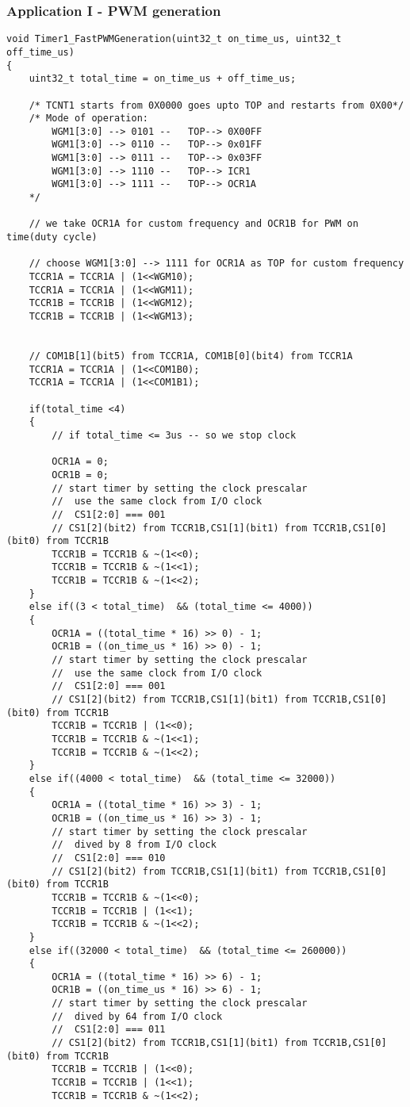 \documentclass{article}
\begin{document}
\subsubsection{Application I - PWM generation}
\begin{verbatim}
void Timer1_FastPWMGeneration(uint32_t on_time_us, uint32_t off_time_us)
{
	uint32_t total_time = on_time_us + off_time_us;
	
	/* TCNT1 starts from 0X0000 goes upto TOP and restarts from 0X00*/
	/* Mode of operation:
		WGM1[3:0] --> 0101 --	TOP--> 0X00FF
		WGM1[3:0] --> 0110 --	TOP--> 0x01FF
		WGM1[3:0] --> 0111 --	TOP--> 0x03FF
		WGM1[3:0] --> 1110 --	TOP--> ICR1
		WGM1[3:0] --> 1111 --	TOP--> OCR1A
	*/
	
	// we take OCR1A for custom frequency and OCR1B for PWM on time(duty cycle)
	
	// choose WGM1[3:0] --> 1111 for OCR1A as TOP for custom frequency
	TCCR1A = TCCR1A | (1<<WGM10);
	TCCR1A = TCCR1A | (1<<WGM11);
	TCCR1B = TCCR1B | (1<<WGM12);
	TCCR1B = TCCR1B | (1<<WGM13);
	

	// COM1B[1](bit5) from TCCR1A, COM1B[0](bit4) from TCCR1A
	TCCR1A = TCCR1A | (1<<COM1B0);
	TCCR1A = TCCR1A | (1<<COM1B1);
	
	if(total_time <4)
	{
		// if total_time <= 3us -- so we stop clock
		
		OCR1A = 0;
		OCR1B = 0;
		// start timer by setting the clock prescalar
		//  use the same clock from I/O clock
		//  CS1[2:0] === 001
		// CS1[2](bit2) from TCCR1B,CS1[1](bit1) from TCCR1B,CS1[0](bit0) from TCCR1B
		TCCR1B = TCCR1B & ~(1<<0);
		TCCR1B = TCCR1B & ~(1<<1);
		TCCR1B = TCCR1B & ~(1<<2);
	}
	else if((3 < total_time)  && (total_time <= 4000))
	{
		OCR1A = ((total_time * 16) >> 0) - 1;
		OCR1B = ((on_time_us * 16) >> 0) - 1;
		// start timer by setting the clock prescalar
		//  use the same clock from I/O clock
		//  CS1[2:0] === 001
		// CS1[2](bit2) from TCCR1B,CS1[1](bit1) from TCCR1B,CS1[0](bit0) from TCCR1B
		TCCR1B = TCCR1B | (1<<0);
		TCCR1B = TCCR1B & ~(1<<1);
		TCCR1B = TCCR1B & ~(1<<2);
	}
	else if((4000 < total_time)  && (total_time <= 32000))
	{
		OCR1A = ((total_time * 16) >> 3) - 1;
		OCR1B = ((on_time_us * 16) >> 3) - 1;
		// start timer by setting the clock prescalar
		//  dived by 8 from I/O clock
		//  CS1[2:0] === 010
		// CS1[2](bit2) from TCCR1B,CS1[1](bit1) from TCCR1B,CS1[0](bit0) from TCCR1B
		TCCR1B = TCCR1B & ~(1<<0);
		TCCR1B = TCCR1B | (1<<1);
		TCCR1B = TCCR1B & ~(1<<2);
	}
	else if((32000 < total_time)  && (total_time <= 260000))
	{
		OCR1A = ((total_time * 16) >> 6) - 1;
		OCR1B = ((on_time_us * 16) >> 6) - 1;
		// start timer by setting the clock prescalar
		//  dived by 64 from I/O clock
		//  CS1[2:0] === 011
		// CS1[2](bit2) from TCCR1B,CS1[1](bit1) from TCCR1B,CS1[0](bit0) from TCCR1B
		TCCR1B = TCCR1B | (1<<0);
		TCCR1B = TCCR1B | (1<<1);
		TCCR1B = TCCR1B & ~(1<<2);
		

\end{verbatim}
\end{document}
